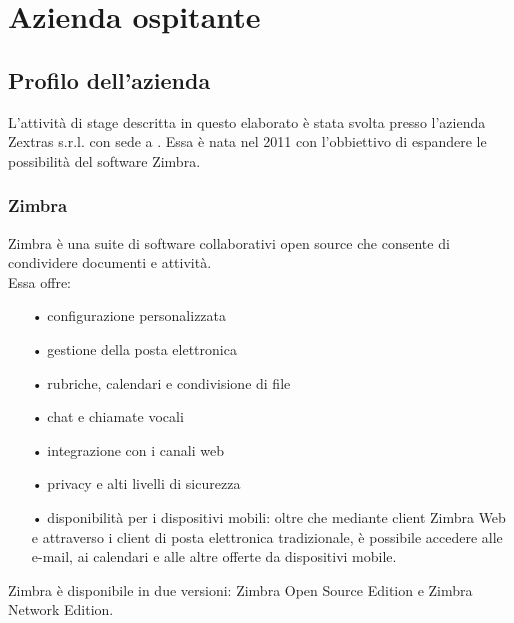 \chapter{Azienda ospitante}

\section{Profilo dell'azienda}
L'attività di stage descritta in questo elaborato è stata svolta presso l'azienda Zextras s.r.l. con sede a  . Essa è nata nel 2011 con l'obbiettivo di espandere le possibilità del software Zimbra.

\subsection{Zimbra}
Zimbra è una suite di software collaborativi open source che consente di condividere documenti e attività.  \\
Essa offre:
\begin{itemize}
	\item[•] configurazione personalizzata
	\item[•] gestione della posta elettronica
	\item[•] rubriche, calendari e condivisione di file
	\item[•] chat e chiamate vocali
	\item[•] integrazione con i canali web
	\item[•] privacy e alti livelli di sicurezza
	\item[•] disponibilità per i dispositivi mobili: oltre che mediante client Zimbra Web e attraverso i client di posta elettronica tradizionale, è possibile accedere alle e-mail, ai calendari e alle altre offerte da dispositivi mobile. 
\end{itemize}
Zimbra è disponibile in due versioni: Zimbra Open Source Edition e Zimbra Network Edition. 

